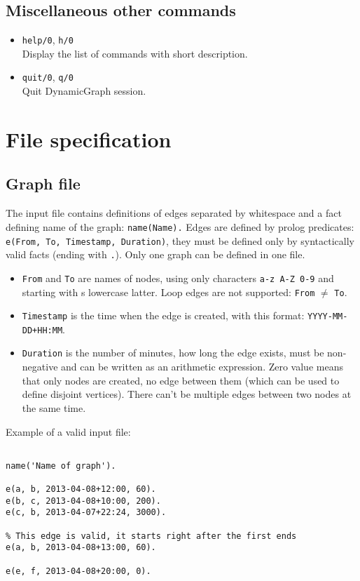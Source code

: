 \documentclass[11pt, a4paper,draft]{article}
\newcommand{\pl}[1]{\texttt{#1}} %
\theoremstyle{plain}
\theoremstyle{definition}
\theoremstyle{remark}
\begin{document}
\subsection{Miscellaneous other commands}

\begin{itemize}
\item \pl{help/0}, \pl{h/0} \\
Display the list of commands with short description.

\item \pl{quit/0}, \pl{q/0} \\
Quit DynamicGraph session.
\end{itemize}

\section{File specification}
\label{sec:files}

\subsection{Graph file}
\label{sec:files-graph}

The input file contains definitions of edges separated by whitespace
and a fact defining name of the graph: \pl{name(Name).}
Edges are defined by prolog predicates: \pl{e(From, To, Timestamp, Duration)},
they must be defined only by syntactically valid facts (ending with \pl{.}).
Only one graph can be defined in one file.

\begin{itemize}
	\item \pl{From} and \pl{To} are names of nodes, using only characters \texttt{a-z A-Z 0-9}
		and starting with s lowercase latter.	
		Loop edges are not supported: \pl{From} $\ne$ \pl{To}.
	\item \pl{Timestamp} is the time when the edge is created,
		with this format: \pl{YYYY-MM-DD+HH:MM}.
	\item \pl{Duration} is the number of minutes, how long the edge exists, must be non-negative
		and can be written as an arithmetic expression.
		Zero value means that only nodes are created, no edge between them (which
        can be used to define disjoint vertices).
		There can't be multiple edges between two nodes at the same time.
\end{itemize}
Example of a valid input file:

\begin{verbatim}

name('Name of graph').

e(a, b, 2013-04-08+12:00, 60).
e(b, c, 2013-04-08+10:00, 200).
e(c, b, 2013-04-07+22:24, 3000).

% This edge is valid, it starts right after the first ends
e(a, b, 2013-04-08+13:00, 60).

e(e, f, 2013-04-08+20:00, 0).

\end{verbatim}
\end{document}
